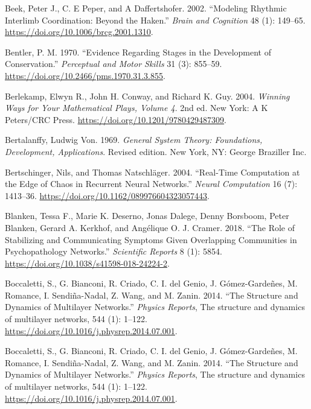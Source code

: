 \documentclass[
  a4paper,
  DIV=11,
  numbers=noendperiod,
  oneside]{scrreprt}
\newlength{\cslhangindent}
\newenvironment{CSLReferences}[2] %
 {\begin{list}{}{%
  \setlength{\itemindent}{0pt}
  \setlength{\leftmargin}{0pt}
  \setlength{\parsep}{0pt}
  \ifodd #1
   \setlength{\leftmargin}{\cslhangindent}
   \setlength{\itemindent}{-1\cslhangindent}
  \fi
  \setlength{\itemsep}{#2\baselineskip}}}
 {\end{list}}
\begin{document}
\begin{CSLReferences}{1}{0}
Beek, Peter J., C. E Peper, and A Daffertshofer. 2002. {``Modeling
{Rhythmic Interlimb Coordination}: {Beyond} the
{Haken}.''} \emph{Brain and
Cognition} 48 (1): 149--65.
\url{https://doi.org/10.1006/brcg.2001.1310}.

Bentler, P. M. 1970. {``Evidence Regarding {Stages} in the {Development}
of {Conservation}.''} \emph{Perceptual and Motor Skills} 31 (3):
855--59. \url{https://doi.org/10.2466/pms.1970.31.3.855}.

Berlekamp, Elwyn R., John H. Conway, and Richard K. Guy. 2004.
\emph{Winning {Ways} for {Your Mathematical Plays}, {Volume} 4}. 2nd ed.
{New York}: {A K Peters/CRC Press}.
\url{https://doi.org/10.1201/9780429487309}.

Bertalanffy, Ludwig Von. 1969. \emph{General {System Theory}:
{Foundations}, {Development}, {Applications}}. Revised edition. {New
York, NY}: {George Braziller Inc.}

Bertschinger, Nils, and Thomas Natschläger. 2004. {``Real-{Time
Computation} at the {Edge} of {Chaos} in {Recurrent Neural Networks}.''}
\emph{Neural Computation} 16 (7): 1413--36.
\url{https://doi.org/10.1162/089976604323057443}.

Blanken, Tessa F., Marie K. Deserno, Jonas Dalege, Denny Borsboom, Peter
Blanken, Gerard A. Kerkhof, and Angélique O. J. Cramer. 2018. {``The
Role of Stabilizing and Communicating Symptoms Given Overlapping
Communities in Psychopathology Networks.''} \emph{Scientific Reports} 8
(1): 5854. \url{https://doi.org/10.1038/s41598-018-24224-2}.

Boccaletti, S., G. Bianconi, R. Criado, C. I. del Genio, J.
Gómez-Gardeñes, M. Romance, I. Sendiña-Nadal, Z. Wang, and M. Zanin.
2014. {``The Structure and Dynamics of Multilayer Networks.''}
\emph{Physics Reports}, The structure and dynamics of multilayer
networks, 544 (1): 1--122.
\url{https://doi.org/10.1016/j.physrep.2014.07.001}.

Boccaletti, S., G. Bianconi, R. Criado, C. I. del Genio, J.
Gómez-Gardeñes, M. Romance, I. Sendiña-Nadal, Z. Wang, and M. Zanin.
2014. {``The Structure and Dynamics of Multilayer Networks.''}
\emph{Physics Reports}, The structure and dynamics of multilayer
networks, 544 (1): 1--122.
\url{https://doi.org/10.1016/j.physrep.2014.07.001}.


\end{CSLReferences}
\end{document}
